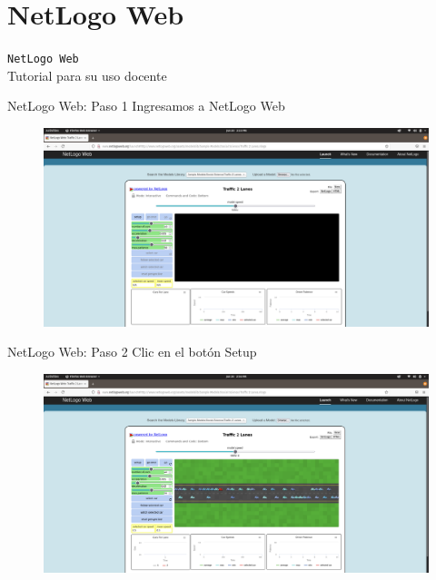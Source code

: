 \documentclass{beamer}
\begin{document}
\section{NetLogo Web}
\begin{frame}
\Huge
\centering
\texttt{NetLogo Web} \\
Tutorial para su uso docente\\
\end{frame}


\begin{frame}{NetLogo Web: Paso 1}
Ingresamos a NetLogo Web
\begin{figure}
\centering
\includegraphics[width=.95\textwidth]{NetLogoWebA.png}
\end{figure}  
\end{frame}

\begin{frame}{NetLogo Web: Paso 2}
Clic en el botón Setup
\begin{figure}
\centering
\includegraphics[width=.92\textwidth]{NetLogoWB.png}
\end{figure}  
\end{frame}
\end{document}
